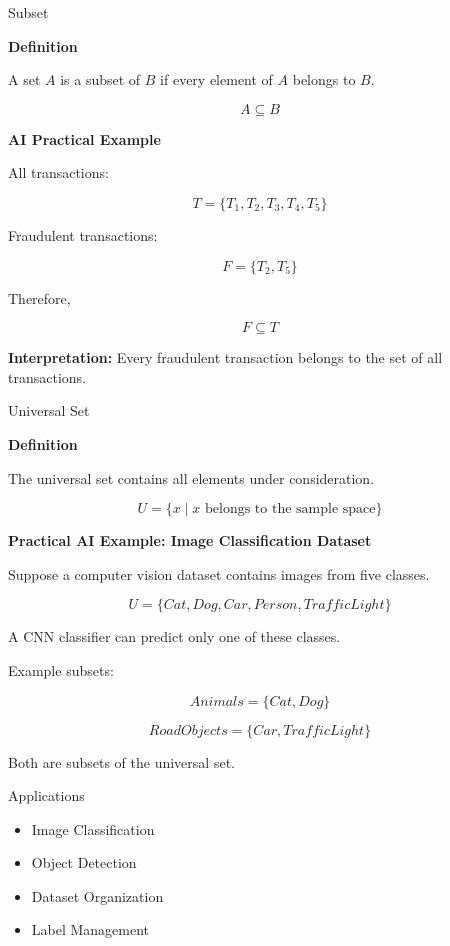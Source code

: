 \documentclass[aspectratio=169]{beamer}
\begin{document}
\begin{frame}{Subset}

\textbf{Definition}

A set \(A\) is a subset of \(B\) if every element of \(A\) belongs to \(B\).

\vspace{0.2cm}

\[
A\subseteq B
\]

\vspace{0.2cm}

\textbf{AI Practical Example}

All transactions:

\[
T=\{T_1,T_2,T_3,T_4,T_5\}
\]

Fraudulent transactions:

\[
F=\{T_2,T_5\}
\]

Therefore,

\[
F\subseteq T
\]

\textbf{Interpretation:} Every fraudulent transaction belongs to the set of all transactions.

\end{frame}
\begin{frame}{Universal Set}

\textbf{Definition}

The universal set contains all elements under consideration.

\vspace{0.3cm}

\[
U=\{x \mid x \text{ belongs to the sample space}\}
\]

\vspace{0.3cm}

\textbf{Practical AI Example: Image Classification Dataset}

Suppose a computer vision dataset contains images from five classes.

\[
U=
\{
Cat,
Dog,
Car,
Person,
TrafficLight
\}
\]

A CNN classifier can predict only one of these classes.

\vspace{0.3cm}

Example subsets:

\[
Animals=\{Cat,Dog\}
\]

\[
RoadObjects=\{Car,TrafficLight\}
\]

Both are subsets of the universal set.

\vspace{0.4cm}

Applications

\begin{itemize}
\item Image Classification
\item Object Detection
\item Dataset Organization
\item Label Management
\end{itemize}

\end{frame}
\end{document}
